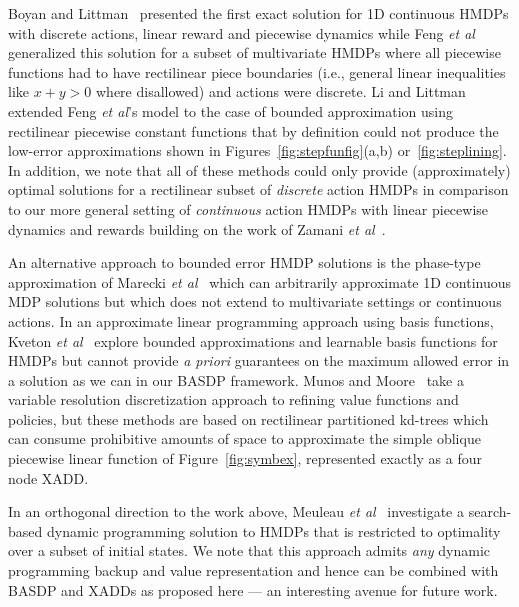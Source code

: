 Boyan and Littman~\cite{boyan01} presented the first exact solution
for 1D continuous HMDPs with discrete actions, linear reward and
piecewise dynamics while Feng {\it et al}~\cite{feng04} generalized
this solution for a subset of multivariate HMDPs where all piecewise
functions had to have rectilinear piece boundaries (i.e., general
linear inequalities like $x + y > 0$ where disallowed) and actions
were discrete.  Li and Littman~\cite{li05} extended Feng {\it et al}'s
model to the case of bounded approximation using rectilinear piecewise
constant functions that by definition could not produce
the low-error approximations shown in Figures~\ref{fig:stepfunfig}(a,b)
or~\ref{fig:steplining}.  In addition, we note that all of these methods
could only provide (approximately) optimal solutions for a rectilinear
subset of \emph{discrete} action HMDPs in comparison to our
more general setting of \emph{continuous} action HMDPs with 
linear piecewise dynamics and rewards building on the work of Zamani
{\it et al}~\cite{zamani12}.  

An alternative approach to bounded error HMDP solutions is the phase-type
approximation of Marecki {\it et al}~\cite{phase07} which can
arbitrarily approximate 1D continuous MDP solutions but which does not
extend to multivariate settings or continuous actions.
In an approximate linear programming approach using basis functions, 
Kveton {\it et al}~\cite{kveton06,kveton06aaai} explore bounded
approximations and learnable basis functions for HMDPs but cannot provide 
\emph{a priori} guarantees on the maximum allowed error in a solution
as we can in our BASDP framework.  Munos and Moore~\cite{munos02} take
a variable resolution discretization approach to refining value
functions and policies, but these methods are based on rectilinear
partitioned kd-trees which can consume
prohibitive amounts of space to approximate the simple oblique
piecewise linear function of Figure~\ref{fig:symbex}, 
represented exactly as a four node XADD.

In an orthogonal direction to the work above, Meuleau {\it et
al}~\cite{hao09} investigate a search-based dynamic programming
solution to HMDPs that is restricted to optimality over a subset of
initial states.  We note that this approach admits \emph{any} dynamic
programming backup and value representation and hence can be combined with
BASDP and XADDs as proposed here --- an interesting avenue for future
work.

